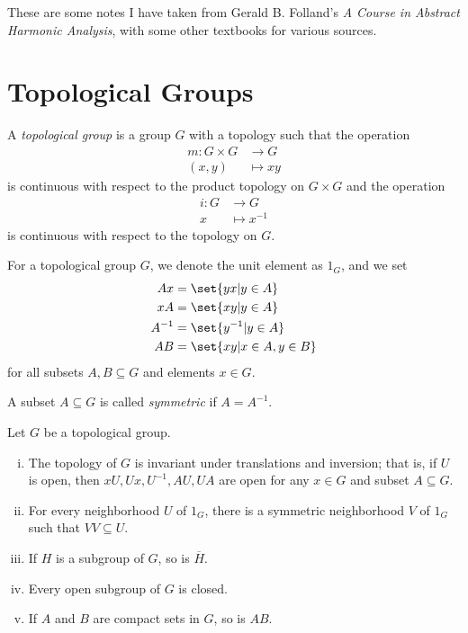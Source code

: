 \documentclass[10pt]{mypackage}
\begin{document}
\RaggedRight
These are some notes I have taken from Gerald B. Folland's \textit{A Course in Abstract Harmonic Analysis}, with some other textbooks for various sources.
\section{Topological Groups}%
\begin{definition}
  A \textit{topological group} is a group $G$ with a topology such that the operation
  \begin{align*}
    m\colon G\times G &\rightarrow G\\
    \left( x,y \right)&\mapsto xy
  \end{align*}
  is continuous with respect to the product topology on $G\times G$ and the operation
  \begin{align*}
    i\colon G&\rightarrow G\\
    x &\mapsto x^{-1}
  \end{align*}
  is continuous with respect to the topology on $G$.\newline

  For a topological group $G$, we denote the unit element as $1_G$, and we set
  \begin{align*}
    Ax &= \set{yx | y\in A}\\
    xA &= \set{xy | y\in A}\\
    A^{-1} &= \set{y^{-1} | y\in A}\\
    AB &= \set{xy | x\in A,y\in B}
  \end{align*}
  for all subsets $A,B\subseteq G$ and elements $x\in G$.
\end{definition}
\begin{definition}
  A subset $A\subseteq G$ is called \textit{symmetric} if $A = A^{-1}$.
\end{definition}
\begin{proposition}
  Let $G$ be a topological group.
  \begin{enumerate}[(i)]
    \item The topology of $G$ is invariant under translations and inversion; that is, if $U$ is open, then $xU,Ux,U^{-1},AU,UA$ are open for any $x\in G$ and subset $A\subseteq G$.
    \item For every neighborhood $U$ of $1_G$, there is a symmetric neighborhood $V$ of $1_G$ such that $VV \subseteq U$.
    \item If $H$ is a subgroup of $G$, so is $ \overline{H} $.
    \item Every open subgroup of $G$ is closed.
    \item If $A$ and $B$ are compact sets in $G$, so is $AB$.
  \end{enumerate}
\end{proposition}
\end{document}
